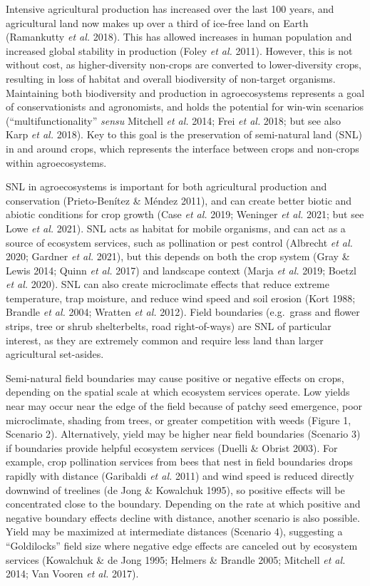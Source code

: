 \documentclass[]{elsarticle} %
\begin{document}
Intensive agricultural production has increased over the last 100 years, and agricultural land now makes up over a third of ice-free land on Earth (Ramankutty \emph{et al.} 2018).
This has allowed increases in human population and increased global stability in production (Foley \emph{et al.} 2011).
However, this is not without cost, as higher-diversity non-crops are converted to lower-diversity crops, resulting in loss of habitat and overall biodiversity of non-target organisms.
Maintaining both biodiversity and production in agroecosystems represents a goal of conservationists and agronomists, and holds the potential for win-win scenarios ({``multifunctionality''} \emph{sensu} Mitchell \emph{et al.} 2014; Frei \emph{et al.} 2018; but see also Karp \emph{et al.} 2018).
Key to this goal is the preservation of semi-natural land (SNL) in and around crops, which represents the interface between crops and non-crops within agroecosystems.

SNL in agroecosystems is important for both agricultural production and conservation (Prieto-Benítez \& Méndez 2011), and can create better biotic and abiotic conditions for crop growth (Case \emph{et al.} 2019; Weninger \emph{et al.} 2021; but see Lowe \emph{et al.} 2021).
SNL acts as habitat for mobile organisms, and can act as a source of ecosystem services, such as pollination or pest control (Albrecht \emph{et al.} 2020; Gardner \emph{et al.} 2021), but this depends on both the crop system (Gray \& Lewis 2014; Quinn \emph{et al.} 2017) and landscape context (Marja \emph{et al.} 2019; Boetzl \emph{et al.} 2020).
SNL can also create microclimate effects that reduce extreme temperature, trap moisture, and reduce wind speed and soil erosion (Kort 1988; Brandle \emph{et al.} 2004; Wratten \emph{et al.} 2012).
Field boundaries (e.g.~grass and flower strips, tree or shrub shelterbelts, road right-of-ways) are SNL of particular interest, as they are extremely common and require less land than larger agricultural set-asides.

Semi-natural field boundaries may cause positive or negative effects on crops, depending on the spatial scale at which ecosystem services operate.
Low yields near may occur near the edge of the field because of patchy seed emergence, poor microclimate, shading from trees, or greater competition with weeds (Figure 1, Scenario 2).
Alternatively, yield may be higher near field boundaries (Scenario 3) if boundaries provide helpful ecosystem services (Duelli \& Obrist 2003).
For example, crop pollination services from bees that nest in field boundaries drops rapidly with distance (Garibaldi \emph{et al.} 2011) and wind speed is reduced directly downwind of treelines (de Jong \& Kowalchuk 1995), so positive effects will be concentrated close to the boundary.
Depending on the rate at which positive and negative boundary effects decline with distance, another scenario is also possible.
Yield may be maximized at intermediate distances (Scenario 4), suggesting a ``Goldilocks'' field size where negative edge effects are canceled out by ecosystem services (Kowalchuk \& de Jong 1995; Helmers \& Brandle 2005; Mitchell \emph{et al.} 2014; Van Vooren \emph{et al.} 2017).
\end{document}
